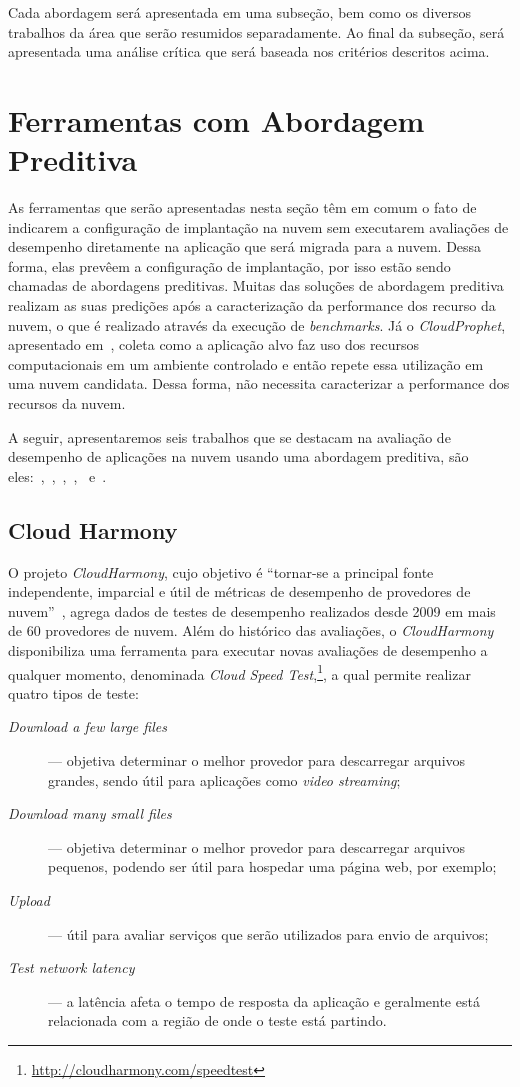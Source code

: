Cada abordagem será apresentada em uma subseção, bem como os diversos trabalhos da área que serão resumidos separadamente. Ao final da subseção, será apresentada uma análise crítica que será baseada nos critérios descritos acima.

\section{Ferramentas com Abordagem Preditiva}
As ferramentas que serão apresentadas nesta seção têm em comum o fato de
indicarem a configuração de implantação na nuvem sem executarem avaliações de
desempenho diretamente na aplicação que será migrada para a nuvem. Dessa forma,
elas prevêem a configuração de implantação, por isso estão sendo chamadas de
abordagens preditivas. Muitas das soluções de abordagem preditiva realizam as
suas predições após a caracterização da performance dos recurso da nuvem, o que
é realizado através da execução de \textit{benchmarks}. Já o
\textit{CloudProphet}, apresentado em~\cite{li2011cloudprophet}, coleta como a
aplicação alvo faz uso dos recursos computacionais em um ambiente controlado e
então repete essa utilização em uma nuvem candidata. Dessa forma, não necessita
caracterizar a performance dos recursos da nuvem.

A seguir, apresentaremos seis trabalhos que se destacam na avaliação de
desempenho de aplicações na nuvem usando uma abordagem preditiva, são
eles:~\cite{cloudharmony},~\cite{malkowski2010cloudxplor},~\cite{li2011},~\cite{jung2013cloudadvisor},~\cite{fittkau2012cdosim}
e~\cite{li2011cloudprophet}.

\subsection{Cloud Harmony}
O projeto {\em CloudHarmony}, cujo
objetivo é ``tornar-se a principal fonte independente, imparcial e útil de
métricas de desempenho de provedores de nuvem''~\cite{cloudharmony}, agrega
dados de testes de desempenho realizados desde 2009 em mais de 60 provedores de
nuvem. Além do histórico das avaliações, o {\em CloudHarmony} disponibiliza uma ferramenta para executar novas avaliações de desempenho a qualquer momento, denominada
\textit{Cloud Speed Test},\footnote{\url{http://cloudharmony.com/speedtest}}, a qual permite realizar quatro tipos de teste:

\begin{description}
  \item[\em Download a few large files] --- objetiva determinar o melhor provedor
  para descarregar arquivos grandes, sendo útil para aplicações como {\em video
  streaming};
  \item[\em Download many small files] --- objetiva determinar o melhor provedor
  para descarregar arquivos pequenos, podendo ser útil para hospedar uma página
  web, por exemplo;
  \item[\em Upload] --- útil para avaliar serviços que serão utilizados para
  envio de arquivos;
  \item[\em Test network latency] --- a latência afeta o tempo de resposta da
  aplicação e geralmente está relacionada com a região de onde o teste está
  partindo.
\end{description}


